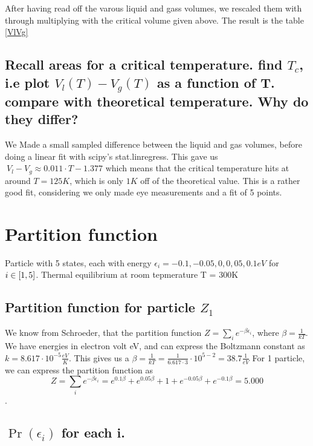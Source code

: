 \documentclass[a4paper,11pt]{article}
\begin{document}
After having read off the varous liquid and gass volumes, we rescaled them with through multiplying with the critical volume given above. The result is 
the table \ref{VlVg}

\subsection{ Recall areas for a critical temperature. find $T_c$, i.e plot $V_l(T) - V_g(T)$ as a function of T. 
            compare with theoretical temperature. Why do they differ? }%

We Made a small sampled difference between the liquid and gas volumes, before doing a linear fit with scipy's stat.linregress. This gave us 
$~ V_l - V_g \approx 0.011\cdot T - 1.377$ which means that the critical temperature hits at around $T = 125 K$, which is only $1 K$ off of the theoretical
value. This is a rather good fit, considering we only made eye measurements and a fit of 5 points.


\section{ Partition function }
Particle with 5 states, each with energy $\epsilon_i = -0.1, -0.05, 0, 0,05, 0.1 eV$ for $i\in \qty[1, 5]$. Thermal 
equilibrium at room tepmerature T = 300K

\subsection{ Partition function for particle $Z_1$ }%

We know from Schroeder, that the partition function $Z = \sum_i e^{-\beta \epsilon_i}$, where $\beta = \frac{1}{kT}$. 
We have energies in electron volt eV, and can express the Boltzmann constant as $k = 8.617\cdot 10^{-5} \frac{eV}{K}$.
This gives us a $\beta = \frac{1}{kT} = \frac{1}{6.617\cdot 3}\cdot 10^{5 - 2} = 38.7 \frac{1}{eV}$
For 1 particle, we can express the partition function as 
\[ Z = \sum_i e^{-\beta \epsilon_i} = e^{0.1\beta} + e^{0.05\beta} + 1 + e^{-0.05\beta} + e^{-0.1\beta} = 5.000 \].


\subsection{ $\Pr(\epsilon_i)$ for each i. }%
\end{document}
